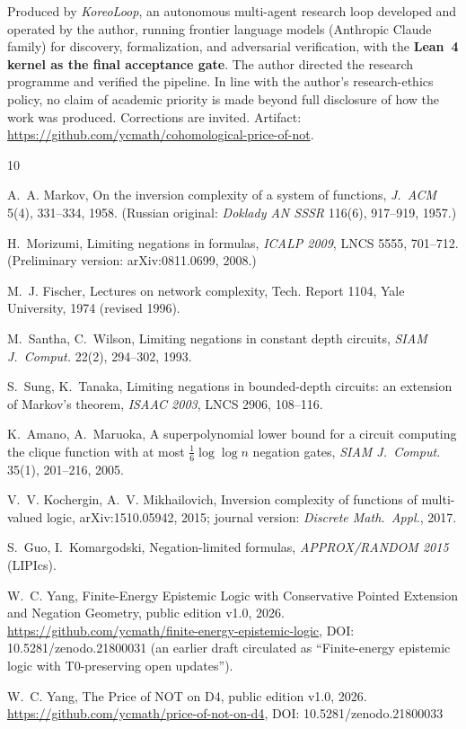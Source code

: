 \documentclass[11pt]{article}
\theoremstyle{remark}
\begin{document}
Produced by \emph{KoreoLoop}, an autonomous multi-agent research loop
developed and operated by the author, running frontier language models
(Anthropic Claude family) for discovery, formalization, and adversarial
verification, with the \textbf{Lean~4 kernel as the final acceptance gate}.
The author directed the research programme and verified the pipeline. In
line with the author's research-ethics policy, no claim of academic priority
is made beyond full disclosure of how the work was produced. Corrections are
invited. Artifact:
\url{https://github.com/ycmath/cohomological-price-of-not}.

\begin{thebibliography}{10}

 A.~A. Markov, On the inversion complexity of a system of
functions, \emph{J.~ACM} 5(4), 331--334, 1958. (Russian original:
\emph{Doklady AN SSSR} 116(6), 917--919, 1957.)

 H.~Morizumi, Limiting negations in formulas,
\emph{ICALP 2009}, LNCS 5555, 701--712. (Preliminary version:
arXiv:0811.0699, 2008.)

 M.~J. Fischer, Lectures on network complexity, Tech.
Report 1104, Yale University, 1974 (revised 1996).

 M.~Santha, C.~Wilson, Limiting negations in constant depth
circuits, \emph{SIAM J.~Comput.} 22(2), 294--302, 1993.

 S.~Sung, K.~Tanaka, Limiting negations in bounded-depth
circuits: an extension of Markov's theorem, \emph{ISAAC 2003}, LNCS 2906,
108--116.

 K.~Amano, A.~Maruoka, A superpolynomial lower bound for a
circuit computing the clique function with at most
$\frac{1}{6}\log\log n$ negation gates, \emph{SIAM J.~Comput.} 35(1),
201--216, 2005.

 V.~V. Kochergin, A.~V. Mikhailovich, Inversion complexity of
functions of multi-valued logic, arXiv:1510.05942, 2015; journal version:
\emph{Discrete Math.\ Appl.}, 2017.

 S.~Guo, I.~Komargodski, Negation-limited formulas,
\emph{APPROX/RANDOM 2015} (LIPIcs).

 W.~C. Yang, Finite-Energy Epistemic Logic with
Conservative Pointed Extension and Negation Geometry, public edition v1.0,
2026. \url{https://github.com/ycmath/finite-energy-epistemic-logic},
DOI: 10.5281/zenodo.21800031 (an earlier draft circulated as ``Finite-energy epistemic logic with
T0-preserving open updates'').

 W.~C. Yang, The Price of NOT on D4, public edition v1.0,
2026. \url{https://github.com/ycmath/price-of-not-on-d4}, DOI: 10.5281/zenodo.21800033

\end{thebibliography}
\end{document}
